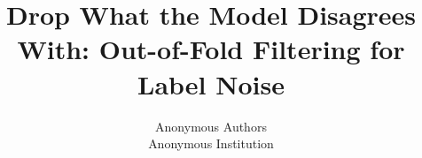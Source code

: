 \documentclass[10pt,twocolumn,letterpaper]{article}
\title{Drop What the Model Disagrees With: Out-of-Fold Filtering for Label Noise}
\author{Anonymous Authors \\ Anonymous Institution}
\begin{document}

\begin{abstract}

\end{abstract}










{\small


}
\end{document}
